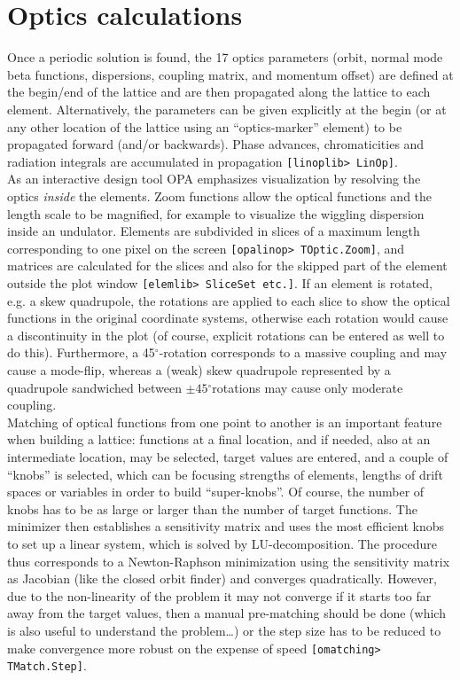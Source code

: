 \documentclass[12pt]{article}
\newcommand{\degree}{\mbox{$^{\circ}$}}
\newcommand\code[1]{{\tt [#1]}}
\begin{document}
\section{Optics calculations}

Once a periodic solution is found, the 17 optics parameters (orbit, normal mode beta functions, dispersions, coupling matrix, and momentum offset) are defined at the begin/end of the lattice and are then propagated along the lattice to each element. Alternatively, the parameters can be given explicitly at the begin (or at any other location of the lattice using an ``optics-marker'' element) to be propagated forward (and/or backwards). Phase advances, chromaticities and radiation integrals are accumulated in propagation \code{linoplib> LinOp}.\\

As an interactive design tool OPA emphasizes visualization by resolving the optics {\em inside} the elements. Zoom functions allow the optical functions and the length scale to be magnified, for example to visualize the wiggling dispersion inside an undulator. Elements are subdivided in slices of a maximum length corresponding to one pixel on the screen \code{opalinop> TOptic.Zoom}, and matrices are calculated for the slices and also for the skipped part of the element outside the plot window \code{elemlib> SliceSet \mbox{\rm etc.}}. If an element is rotated, e.g. a skew quadrupole, the rotations are applied to each slice to show the optical functions in the original coordinate systems, otherwise each rotation would cause a discontinuity in the plot (of course, explicit rotations can be entered as well to do this). Furthermore, a 45\degree-rotation corresponds to a massive coupling and may cause a mode-flip, whereas a (weak) skew quadrupole represented by a quadrupole sandwiched between $\pm 45$\degree\-rotations may cause only moderate coupling.\\

Matching of optical functions from one point to another is an important feature when building a lattice: functions at a final location, and if needed, also at an intermediate location, may be selected, target values are entered, and a couple of ``knobs'' is selected, which can be focusing strengths of elements, lengths of drift spaces or variables in order to build ``super-knobs''. Of course, the number of knobs has to be as large or larger than the number of target functions. The minimizer then establishes a sensitivity matrix and uses the most efficient knobs to set up a linear system, which is solved by LU-decomposition. The procedure thus corresponds to a Newton-Raphson minimization using the sensitivity matrix as Jacobian (like the closed orbit finder) and converges quadratically. However, due to the non-linearity of the problem it may not converge if it starts too far away from the target values, then a manual pre-matching should be done (which is also useful to understand the problem\dots ) or the step size has to be reduced to make convergence more robust on the expense of speed \code{omatching> TMatch.Step}.
\end{document}
